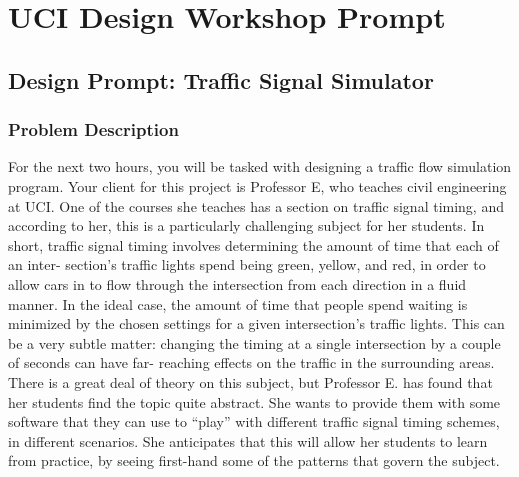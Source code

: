 \section{UCI Design Workshop Prompt}
\label{sect:designprompt}

\subsection*{Design Prompt: Traffic Signal Simulator}

\subsubsection*{Problem Description}

For the next two hours, you will be tasked with designing a traffic flow simulation program. Your client for this project is Professor E, who teaches civil engineering at UCI. One of the courses she teaches has a section on traffic signal timing, and according to her, this is a particularly challenging subject for her students. In short, traffic signal timing involves determining the amount of time that each of an inter- section's traffic lights spend being green, yellow, and red, in order to allow cars in to flow through the intersection from each direction in a fluid manner. In the ideal case, the amount of time that people spend waiting is minimized by the chosen settings for a given intersection's traffic lights. This can be a very subtle matter: changing the timing at a single intersection by a couple of seconds can have far- reaching effects on the traffic in the surrounding areas. There is a great deal of theory on this subject, but Professor E. has found that her students find the topic quite abstract. She wants to provide them with some software that they can use to ``play'' with different traffic signal timing schemes, in different scenarios. She anticipates that this will allow her students to learn from practice, by seeing first-hand some of the patterns that govern the subject.

